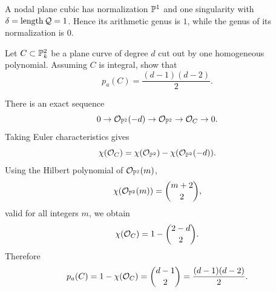 \begin{example}
A nodal plane cubic has normalization \(\mathbb{P}^1\) and one singularity with
\(\delta=\operatorname{length} \mathcal Q=1\).  Hence its arithmetic genus is \(1\), while
the genus of its normalization is \(0\).
\end{example}

\begin{exercise}\label{ex:plane-curve-pa}
Let \(C\subset\mathbb{P}^2_k\) be a plane curve of degree \(d\) cut out by one
homogeneous polynomial.  Assuming \(C\) is integral, show that
\[
    p_a(C)=\frac{(d-1)(d-2)}{2}.
\]
\end{exercise}

\begin{solution}
There is an exact sequence
\[
    0\to\mathcal{O}_{\mathbb{P}^2}(-d)\to\mathcal{O}_{\mathbb{P}^2}\to\mathcal{O}_C\to0.
\]
Taking Euler characteristics gives
\[
    \chi(\mathcal{O}_C)=\chi(\mathcal{O}_{\mathbb{P}^2})-\chi(\mathcal{O}_{\mathbb{P}^2}(-d)).
\]
Using the Hilbert polynomial of \(\mathcal{O}_{\mathbb{P}^2}(m)\),
\[
    \chi(\mathcal{O}_{\mathbb{P}^2}(m))=\binom{m+2}{2},
\]
valid for all integers \(m\), we obtain
\[
    \chi(\mathcal{O}_C)=1-\binom{2-d}{2}.
\]
Therefore
\[
    p_a(C)=1-\chi(\mathcal{O}_C)=\binom{d-1}{2}
    =\frac{(d-1)(d-2)}{2}.
\]
\end{solution}
